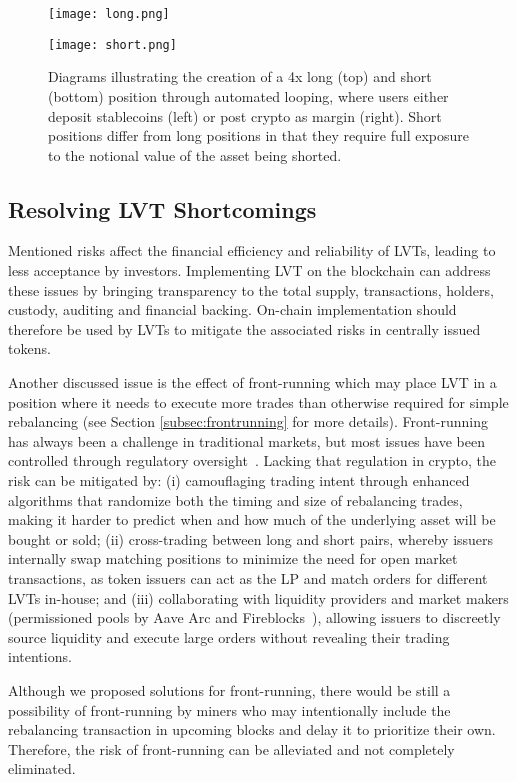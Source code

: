 \begin{figure}[p]
	\centering
	\texttt{[image: long.png]}
	\caption[Long vs. Short Position Creation]{Diagrams illustrating the creation of a 4x long (top) and short (bottom) position through automated looping, where users either deposit stablecoins (left) or post crypto as margin (right). Short positions differ from long positions in that they require full exposure to the notional value of the asset being shorted.}
	\centering
	\texttt{[image: short.png]}
	\label{fig:looping}
\end{figure}

\subsection{Resolving LVT Shortcomings}\label{subsec:resolve}
Mentioned risks affect the financial efficiency and reliability of LVTs, leading to less acceptance by investors. Implementing LVT on the blockchain can address these issues by bringing transparency to the total supply, transactions, holders, custody, auditing and financial backing. On-chain implementation should therefore be used by LVTs to mitigate the associated risks in centrally issued tokens.

Another discussed issue is the effect of front-running which may place LVT in a position where it needs to execute more trades than otherwise required for simple rebalancing (see Section \ref{subsec:frontrunning} for more details). Front-running has always been a challenge in traditional markets, but most issues have been controlled through regulatory oversight~\cite{SEC_Oversight}. Lacking that regulation in crypto, the risk can be mitigated by: (i) camouflaging trading intent through enhanced algorithms that randomize both the timing and size of rebalancing trades, making it harder to predict when and how much of the underlying asset will be bought or sold; (ii) cross-trading between long and short pairs, whereby issuers internally swap matching positions to minimize the need for open market transactions, as token issuers can act as the LP and match orders for different LVTs in-house; and (iii) collaborating with liquidity providers and market makers (\eg permissioned pools by Aave Arc and Fireblocks~\cite{Aave_Arc}), allowing issuers to discreetly source liquidity and execute large orders without revealing their trading intentions.

Although we proposed solutions for front-running, there would be still a possibility of front-running by miners who may intentionally include the rebalancing transaction in upcoming blocks and delay it to prioritize their own. Therefore, the risk of front-running can be alleviated and not completely eliminated.

